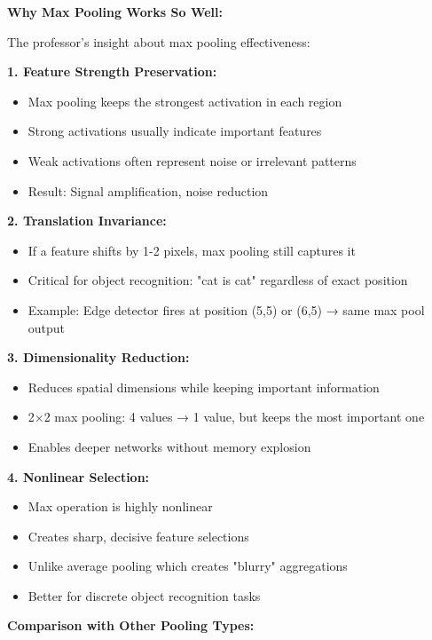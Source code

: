 \documentclass[12pt]{article}
\newcommand{\explanation}[1]{{\color{explanationcolor}#1}}
\begin{document}
\begin{enumerate}[(a)]
{    \textbf{Why Max Pooling Works So Well:}
    
    \explanation{
    The professor's insight about max pooling effectiveness:
    
    \textbf{1. Feature Strength Preservation:}
    \begin{itemize}
        \item Max pooling keeps the strongest activation in each region
        \item Strong activations usually indicate important features
        \item Weak activations often represent noise or irrelevant patterns
        \item Result: Signal amplification, noise reduction
    \end{itemize}
    
    \textbf{2. Translation Invariance:}
    \begin{itemize}
        \item If a feature shifts by 1-2 pixels, max pooling still captures it
        \item Critical for object recognition: "cat is cat" regardless of exact position
        \item Example: Edge detector fires at position (5,5) or (6,5) → same max pool output
    \end{itemize}
    
    \textbf{3. Dimensionality Reduction:}
    \begin{itemize}
        \item Reduces spatial dimensions while keeping important information
        \item 2×2 max pooling: 4 values → 1 value, but keeps the most important one
        \item Enables deeper networks without memory explosion
    \end{itemize}
    
    \textbf{4. Nonlinear Selection:}
    \begin{itemize}
        \item Max operation is highly nonlinear
        \item Creates sharp, decisive feature selections
        \item Unlike average pooling which creates "blurry" aggregations
        \item Better for discrete object recognition tasks
    \end{itemize}
    }
    
    \textbf{Comparison with Other Pooling Types:}
    
}
\end{enumerate}
\end{document}
